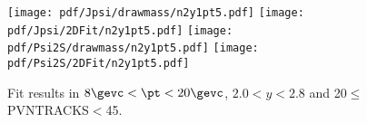 \begin{figure}[H]
\begin{center}
\texttt{[image: pdf/Jpsi/drawmass/n2y1pt5.pdf]}
\texttt{[image: pdf/Jpsi/2DFit/n2y1pt5.pdf]}
\vspace*{-0.5cm}
\texttt{[image: pdf/Psi2S/drawmass/n2y1pt5.pdf]}
\texttt{[image: pdf/Psi2S/2DFit/n2y1pt5.pdf]}
\vspace*{-0.5cm}
\end{center}
\caption{Fit results in $8\gevc<\pt<20\gevc$, $2.0<y<2.8$ and 20$\leq$PVNTRACKS$<$45.}
\label{Fitn2y1pt5}
\end{figure}
